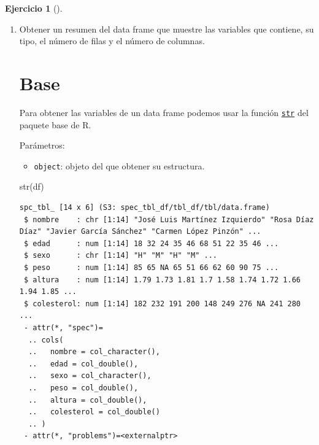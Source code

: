 \documentclass[
  spanish,
  a4paper,
]{scrreport}
\newenvironment{Shaded}{\begin{snugshade}}{\end{snugshade}}
\newcommand{\FunctionTok}[1]{\textcolor[rgb]{0.28,0.35,0.67}{#1}}
\newcommand{\NormalTok}[1]{\textcolor[rgb]{0.00,0.23,0.31}{#1}}
\providecommand{\tightlist}{%
  \setlength{\itemsep}{0pt}\setlength{\parskip}{0pt}}
\theoremstyle{definition}
\newtheorem{exercise}{Ejercicio}[chapter]
\theoremstyle{remark}
\begin{document}
\begin{exercise}[]
\begin{enumerate}
\begin{tcolorbox}
  \end{tcolorbox}
\item
  Obtener un resumen del data frame que muestre las variables que
  contiene, su tipo, el número de filas y el número de columnas.

  \begin{tcolorbox}[enhanced jigsaw, colback=white, coltitle=black, toprule=.15mm, rightrule=.15mm, opacitybacktitle=0.6, opacityback=0, bottomtitle=1mm, toptitle=1mm, titlerule=0mm, breakable, leftrule=.75mm, title=\textcolor{quarto-callout-tip-color}{\faLightbulb}\hspace{0.5em}{Solución}, arc=.35mm, left=2mm, bottomrule=.15mm, colframe=quarto-callout-tip-color-frame, colbacktitle=quarto-callout-tip-color!10!white]

  \section{Base}

  Para obtener las variables de un data frame podemos usar la función
  \href{https://www.rdocumentation.org/packages/base/versions/3.6.2/topics/str}{\texttt{str}}
  del paquete base de R.

  Parámetros:

  \begin{itemize}
  \tightlist
  \item
    \texttt{object}: objeto del que obtener su estructura.
  \end{itemize}

\begin{Shaded}
\begin{Highlighting}[]
\FunctionTok{str}\NormalTok{(df)}
\end{Highlighting}
\end{Shaded}

\begin{verbatim}
spc_tbl_ [14 x 6] (S3: spec_tbl_df/tbl_df/tbl/data.frame)
 $ nombre    : chr [1:14] "José Luis Martínez Izquierdo" "Rosa Díaz Díaz" "Javier García Sánchez" "Carmen López Pinzón" ...
 $ edad      : num [1:14] 18 32 24 35 46 68 51 22 35 46 ...
 $ sexo      : chr [1:14] "H" "M" "H" "M" ...
 $ peso      : num [1:14] 85 65 NA 65 51 66 62 60 90 75 ...
 $ altura    : num [1:14] 1.79 1.73 1.81 1.7 1.58 1.74 1.72 1.66 1.94 1.85 ...
 $ colesterol: num [1:14] 182 232 191 200 148 249 276 NA 241 280 ...
 - attr(*, "spec")=
  .. cols(
  ..   nombre = col_character(),
  ..   edad = col_double(),
  ..   sexo = col_character(),
  ..   peso = col_double(),
  ..   altura = col_double(),
  ..   colesterol = col_double()
  .. )
 - attr(*, "problems")=<externalptr> 
\end{verbatim}


\end{tcolorbox}
\end{enumerate}
\end{exercise}
\end{document}
